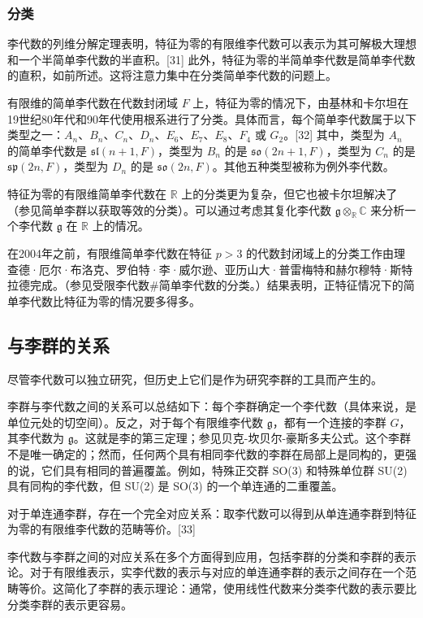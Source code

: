 \subsubsection{分类}
李代数的列维分解定理表明，特征为零的有限维李代数可以表示为其可解极大理想和一个半简单李代数的半直积。[31] 此外，特征为零的半简单李代数是简单李代数的直积，如前所述。这将注意力集中在分类简单李代数的问题上。

有限维的简单李代数在代数封闭域 \(F\) 上，特征为零的情况下，由基林和卡尔坦在19世纪80年代和90年代使用根系进行了分类。具体而言，每个简单李代数属于以下类型之一：\(A_n\)、\(B_n\)、\(C_n\)、\(D_n\)、\(E_6\)、\(E_7\)、\(E_8\)、\(F_4\) 或 \(G_2\)。[32] 其中，类型为 \(A_n\) 的简单李代数是 \(\mathfrak{sl}(n+1,F)\)，类型为 \(B_n\) 的是 \(\mathfrak{so}(2n+1,F)\)，类型为 \(C_n\) 的是 \(\mathfrak{sp}(2n,F)\)，类型为 \(D_n\) 的是 \(\mathfrak{so}(2n,F)\)。其他五种类型被称为例外李代数。

特征为零的有限维简单李代数在 \(\mathbb{R}\) 上的分类更为复杂，但它也被卡尔坦解决了（参见简单李群以获取等效的分类）。可以通过考虑其复化李代数 \(\mathfrak{g} \otimes_{\mathbb{R}} \mathbb{C}\) 来分析一个李代数 \(\mathfrak{g}\) 在 \(\mathbb{R}\) 上的情况。

在2004年之前，有限维简单李代数在特征 \(p > 3\) 的代数封闭域上的分类工作由理查德·厄尔·布洛克、罗伯特·李·威尔逊、亚历山大·普雷梅特和赫尔穆特·斯特拉德完成。（参见受限李代数#简单李代数的分类。）结果表明，正特征情况下的简单李代数比特征为零的情况要多得多。
\subsection{与李群的关系}
尽管李代数可以独立研究，但历史上它们是作为研究李群的工具而产生的。

李群与李代数之间的关系可以总结如下：每个李群确定一个李代数（具体来说，是单位元处的切空间）。反之，对于每个有限维李代数 \(\mathfrak{g}\)，都有一个连接的李群 \(G\)，其李代数为 \(\mathfrak{g}\)。这就是李的第三定理；参见贝克-坎贝尔-豪斯多夫公式。这个李群不是唯一确定的；然而，任何两个具有相同李代数的李群在局部上是同构的，更强的说，它们具有相同的普遍覆盖。例如，特殊正交群 SO(3) 和特殊单位群 SU(2) 具有同构的李代数，但 SU(2) 是 SO(3) 的一个单连通的二重覆盖。

对于单连通李群，存在一个完全对应关系：取李代数可以得到从单连通李群到特征为零的有限维李代数的范畴等价。[33]

李代数与李群之间的对应关系在多个方面得到应用，包括李群的分类和李群的表示论。对于有限维表示，实李代数的表示与对应的单连通李群的表示之间存在一个范畴等价。这简化了李群的表示理论：通常，使用线性代数来分类李代数的表示要比分类李群的表示更容易。

